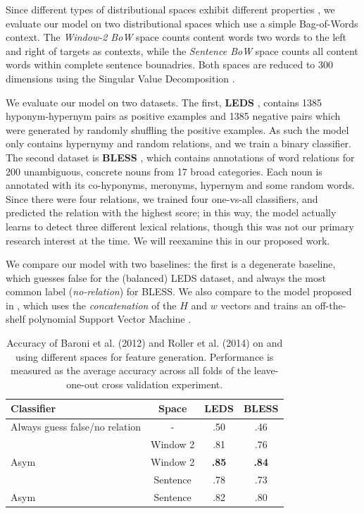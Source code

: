 \documentclass[12pt]{article}
\begin{document}
Since different types of distributional spaces exhibit different properties
\cite{pado:2007:cl}, we evaluate our model on two distributional
spaces which use a simple Bag-of-Words context.  The {\em Window-2 BoW} space
counts content words two words to the left and right of targets as contexts,
while the {\em Sentence BoW} space counts all content words within complete
sentence bounadries. Both spaces are reduced to 300 dimensions using the
Singular Value Decomposition \cite{landauer:1997:pr}.

We evaluate our model on two datasets. The first, {\bf LEDS}
\cite{baroni:2012:eacl}, contains 1385 hyponym-hypernym pairs as positive
examples and 1385 negative pairs which were generated by randomly shuffling the
positive examples. As such the model only contains hypernymy and random
relations, and we train a binary classifier. The second dataset is {\bf
BLESS} \cite{baroni:2011:gems}, which contains annotations of word relations
for 200 unambiguous, concrete nouns from 17 broad categories. Each noun is
annotated with its co-hyponyms, meronyms, hypernym and some random words.
Since there were four relations, we trained four one-vs-all classifiers, and
predicted the relation with the highest score; in this way, the model
actually learns to detect three different lexical relations, though this
was not our primary research interest at the time. We will reexamine this in
our proposed work.

We compare our model with two baselines: the first is a degenerate baseline,
which guesses false for the (balanced) LEDS dataset, and always
the most common label ({\em no-relation}) for BLESS. We also compare to the
model proposed in , which uses the {\em concatenation}
of the $H$ and $w$ vectors and trains an off-the-shelf polynomial Support
Vector Machine \cite{cortes:1995:ml}.

\begin{table}
  \centering
  \begin{tabular}{|lc|cc|}
    \hline
    {\bf Classifier} & {\bf Space} & {\bf LEDS} & {\bf BLESS}\\
    \hline
    Always guess false/no relation     &   -      & .50          & .46      \\
    \hline
    \cite{baroni:2012:eacl}            & Window 2 & .81          & .76      \\
    Asym \cite{roller:2014:coling}     & Window 2 & {\bf .85}    & {\bf .84}\\
    \cite{baroni:2012:eacl}            & Sentence & .78          & .73      \\
    Asym \cite{roller:2014:coling}     & Sentence & .82          & .80      \\
    \hline
  \end{tabular}
  \caption{Accuracy of Baroni et al. (2012) and Roller et al. (2014) on
  {\bless} and {\entailment}
  using different spaces for feature generation. Performance is measured as
  the average accuracy across all folds of the leave-one-out cross validation
  experiment.}
  \label{tab:asymresults}
\end{table}
\end{document}
